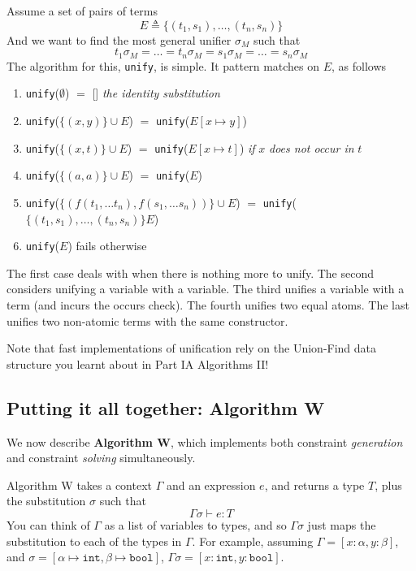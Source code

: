 {Assume a set of pairs of terms 
\[E \triangleq \{(t_1, s_1), \ldots, (t_n, s_n)\}\]
And we want to find the most general unifier $\sigma_M$ such that
\[t_1\sigma_M = \ldots = t_n\sigma_M = s_1\sigma_M = \ldots = s_n\sigma_M\]
The algorithm for this, \texttt{unify}, is simple. It pattern matches on $E$, as follows

\begin{enumerate}
    \item \texttt{unify}($\emptyset$) $=$ [] \textit{the identity substitution}
    \item \texttt{unify}($\{(x, y)\} \cup E$) $=$ \texttt{unify}($E[x \mapsto y]$)
    \item \texttt{unify}($\{(x, t)\} \cup E$) $=$ \texttt{unify}($E[x \mapsto t]$) \textit{if} $x$ \textit{does not occur in} $t$
    \item \texttt{unify}($\{(a, a)\} \cup E$) $=$ \texttt{unify}($E$)
    \item \texttt{unify}($\{(f(t_1, \ldots t_n), f(s_1, \ldots s_n))\} \cup E$) $=$ \texttt{unify}($\{(t_1, s_1), \ldots, (t_n, s_n)\} E$)
    \item \texttt{unify}($E$) fails otherwise
\end{enumerate}

The first case deals with when there is nothing more to unify. The second considers unifying a variable with a variable. The third unifies a variable with a term (and incurs the occurs check). The fourth unifies two equal atoms. The last unifies two non-atomic terms with the same constructor.

Note that fast implementations of unification rely on the Union-Find data structure you learnt about in \textsf{Part IA Algorithms II}!

\subsection{Putting it all together: Algorithm W}
We now describe \textbf{Algorithm W}, which implements both constraint \textit{generation} and constraint \textit{solving} simultaneously.

Algorithm W takes a context $\Gamma$ and an expression $e$, and returns a type $T$, plus the substitution $\sigma$ such that 
\[\Gamma \sigma \vdash e : T\]
You can think of $\Gamma$ as a list of variables to types, and so $\Gamma \sigma$ just maps the substitution to each of the types in $\Gamma$. For example, assuming $\Gamma = [x: \alpha, y: \beta]$, and $\sigma = [\alpha \mapsto \texttt{int}, \beta \mapsto \texttt{bool}]$, $\Gamma \sigma = [x: \texttt{int}, y: \texttt{bool}]$.

}
